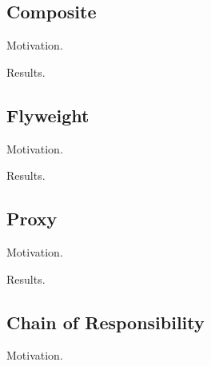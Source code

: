 \subsection{Composite}

  Motivation. 

  \begin{definition}[]
    
  \end{definition}

  Results. 

  \begin{example}
    
  \end{example}

\subsection{Flyweight}

  Motivation. 

  \begin{definition}[]
    
  \end{definition}

  Results. 

  \begin{example}
    
  \end{example}

\subsection{Proxy}

  Motivation. 

  \begin{definition}[]
    
  \end{definition}

  Results. 

  \begin{example}
    
  \end{example}

\subsection{Chain of Responsibility}

  Motivation. 

  \begin{definition}[]
    
  \end{definition}

